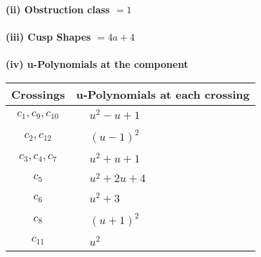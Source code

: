 \documentclass[1p]{elsarticle_modified}
\theoremstyle{definition}
\begin{document}
\flushleft \textbf{(ii) Obstruction class $= 1$}\\~\\
\flushleft \textbf{(iii) Cusp Shapes $= 4 a+4$}\\~\\
\newpage\renewcommand{\arraystretch}{1}
\flushleft \textbf{(iv) u-Polynomials at the component}\newline \\
\begin{tabular}{m{50pt}|m{274pt}}
Crossings & \hspace{64pt}u-Polynomials at each crossing \\
\hline $$\begin{aligned}c_{1},c_{9},c_{10}\end{aligned}$$&$\begin{aligned}
&u^2- u+1
\end{aligned}$\\
\hline $$\begin{aligned}c_{2},c_{12}\end{aligned}$$&$\begin{aligned}
&(u-1)^2
\end{aligned}$\\
\hline $$\begin{aligned}c_{3},c_{4},c_{7}\end{aligned}$$&$\begin{aligned}
&u^2+u+1
\end{aligned}$\\
\hline $$\begin{aligned}c_{5}\end{aligned}$$&$\begin{aligned}
&u^2+2 u+4
\end{aligned}$\\
\hline $$\begin{aligned}c_{6}\end{aligned}$$&$\begin{aligned}
&u^2+3
\end{aligned}$\\
\hline $$\begin{aligned}c_{8}\end{aligned}$$&$\begin{aligned}
&(u+1)^2
\end{aligned}$\\
\hline $$\begin{aligned}c_{11}\end{aligned}$$&$\begin{aligned}
&u^2
\end{aligned}$\\
\hline
\end{tabular}\\~\\
\end{document}
